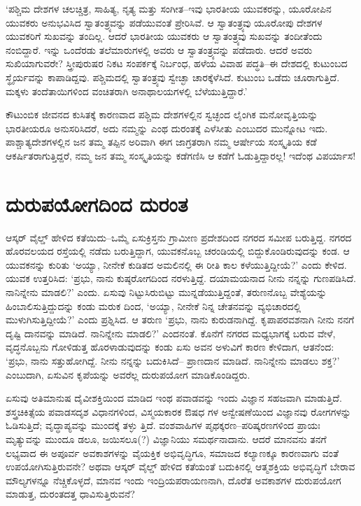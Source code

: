 ‘ಪಶ್ಚಿಮ ದೇಶಗಳ ಚಲಚ್ಚಿತ್ರ, ಸಾಹಿತ್ಯ, ನೃತ್ಯ ಮತ್ತು ಸಂಗೀತ–ಇವು ಭಾರತೀಯ ಯುವಕರನ್ನು, ಯೂರೋಪಿನ ಯುವಕರು ಅನುಭವಿಸಿದ ಸ್ವಾತಂತ್ರ್ಯವನ್ನು ಪಡೆಯುವಂತೆ ಪ್ರೇರಿಸಿವೆ. ಆ ಸ್ವಾತಂತ್ರ್ಯವು ಯೂರೋಪು ದೇಶಗಳ ಯುವಕರಿಗೆ ಸುಖವನ್ನು ತಂದಿಲ್ಲ. ಆದರೆ ಭಾರತೀಯ ಯುವಕರು ಆ ಸ್ವಾತಂತ್ರ್ಯವು ಸುಖವನ್ನು ತಂದೀತೆಂದು ನಂಬಿದ್ದಾರೆ. ಇನ್ನು ಒಂದೆರಡು ತಲೆಮಾರುಗಳಲ್ಲಿ ಅವರು ಆ ಸ್ವಾತಂತ್ರ್ಯವನ್ನು ಪಡೆದಾರು. ಆದರೆ ಅವರು ಸುಖಿಯಾಗುವರೇ? ಸ್ತ್ರೀಪುರುಷರ ನಿಕಟ ಸಂಪರ್ಕಕ್ಕೆ ನಿರ್ಬಂಧ, ಹಳೆಯ ವಿವಾಹ ಪದ್ಧತಿ–ಈ ದೇಶದಲ್ಲಿ ಕುಟುಂಬದ ಸ್ಥೈರ್ಯವನ್ನು ಕಾಪಾಡಿದ್ದವು. ಪಶ್ಚಿಮದಲ್ಲಿ ಸ್ವಾತಂತ್ರ್ಯವು ಸ್ವೇಚ್ಛಾ ಚಾರಕ್ಕೆಳೆಸಿದೆ. ಕುಟುಂಬ ಒಡೆದು ಚೂರಾಗುತ್ತಿದೆ. ಮಕ್ಕಳು ತಂದೆತಾಯಿಗಳಿಂದ ವಂಚಿತರಾಗಿ ಅನಾಥಾಲಯಗಳಲ್ಲಿ ಬೆಳೆಯುತ್ತಿದ್ದಾರೆ.’

ಕೌಟುಂಬಿಕ ಜೀವನದ ಕುಸಿತಕ್ಕೆ ಕಾರಣವಾದ ಪಶ್ಚಿಮ ದೇಶಗಳಲ್ಲಿನ ಸ್ವಚ್ಛಂದ ಲೈಂಗಿಕ ಮನೋವೃತ್ತಿಯನ್ನು ಭಾರತೀಯರೂ ಅನುಸರಿಸಿದರೆ, ಅದು ನಮ್ಮನ್ನು ಎಂಥ ದುರಂತಕ್ಕೆ ಎಳೆಸೀತು ಎಂಬುದರ ಮುನ್ನೋಟ ಇದು. ಪಾಶ್ಚಾತ್ಯದೇಶಗಳಲ್ಲಿನ ಜನ ತಮ್ಮ ತಪ್ಪಿನ ಅರಿವಾಗಿ ಈಗ ಜಾಗ್ರತರಾಗಿ ನಮ್ಮ ಆರ್ಷೇಯ ಸಂಸ್ಕೃತಿಯ ಕಡೆ ಆಕರ್ಷಿತರಾಗುತ್ತಿದ್ದರೆ, ನಮ್ಮ ಜನ ತಮ್ಮ ಸಂಸ್ಕೃತಿಯನ್ನು ಕಡೆಗಣಿಸಿ ಆ ಕಡೆಗೆ ಓಡುತ್ತಿದ್ದಾರಲ್ಲ! ಇದೆಂಥ ವಿಪರ್ಯಾಸ!


\section{ದುರುಪಯೋಗದಿಂದ ದುರಂತ}

ಆಸ್ಕರ್ ವೈಲ್ಡ್ ಹೇಳಿದ ಕತೆಯಿದು–ಒಮ್ಮೆ ಏಸುಕ್ರಿಸ್ತನು ಗ್ರಾಮೀಣ ಪ್ರದೇಶದಿಂದ ನಗರದ ಸಮೀಪ ಬರುತ್ತಿದ್ದ. ನಗರದ ಹೊರವಲಯದ ರಸ್ತೆಯಲ್ಲಿ ನಡೆದು ಬರುತ್ತಿದ್ದಾಗ, ಯುವಕನೊಬ್ಬ ಚರಂಡಿಯಲ್ಲಿ ಬಿದ್ದುಕೊಂಡಿರುವುದನ್ನು ಕಂಡ. ಆ ಯುವಕನನ್ನು ಕುರಿತು ‘ಅಯ್ಯಾ, ನೀನೇಕೆ ಕುಡಿತದ ಅಮಲಿನಲ್ಲಿ ಈ ರೀತಿ ಕಾಲ ಕಳೆಯುತ್ತಿದ್ದೀಯೆ?’ ಎಂದು ಕೇಳಿದ. ಯುವಕ ಉತ್ತರಿಸಿದ: ‘ಪ್ರಭು, ನಾನು ಕುಷ್ಠರೋಗದಿಂದ ನರಳುತ್ತಿದ್ದೆ. ದಯಾಮಯನಾದ ನೀನು ನನ್ನನ್ನು ಗುಣಪಡಿಸಿದೆ. ನಾನಿನ್ನೇನು ಮಾಡಲಿ?’ ಎಂದು. ಏಸುವು ನಿಟ್ಟುಸಿರುಬಿಟ್ಟು ಮುನ್ನಡೆಯುತ್ತಿದ್ದಂತೆ, ತರುಣನೊಬ್ಬ ವೇಶ್ಯೆಯನ್ನು ಹಿಂಬಾಲಿಸುತ್ತಿದ್ದುದನ್ನು ಕಂಡು ಮರುಕ ದಿಂದ, ‘ಅಯ್ಯಾ, ನೀನೇಕೆ ನಿನ್ನ ಚೇತನವನ್ನು ವ್ಯಭಿಚಾರದಲ್ಲಿ ಮುಳುಗಿಸುತ್ತಿದ್ದೀಯೆ?’ ಎಂದು ಪ್ರಶ್ನಿಸಿದ. ಆ ತರುಣ ‘ಪ್ರಭು, ನಾನು ಕುರುಡನಾಗಿದ್ದೆ. ಕೃಪಾಪರವಶನಾಗಿ ನೀನು ನನಗೆ ದೃಷ್ಟಿ ದಾನವನ್ನು ಮಾಡಿದೆ. ನಾನಿನ್ನೇನು ಮಾಡಲಿ?’ ಎಂದನಂತೆ. ಕೊನೆಗೆ ನಗರದ ಮಧ್ಯಭಾಗಕ್ಕೆ ಬರುವ ವೇಳೆ, ವೃದ್ಧನೊಬ್ಬನು ಗೋಳಿಡುತ್ತ ಹೊರಳಾಡುವುದನ್ನು ಕಂಡು ಏಸು ಅವನ ಅಳುವಿಗೆ ಕಾರಣ ಕೇಳಿದಾಗ, ಆತನೆಂದ: ‘ಪ್ರಭು, ನಾನು ಸತ್ತುಹೋಗಿದ್ದೆ. ನೀನು ನನ್ನನ್ನು ಬದುಕಿಸಿದೆ– ಪ್ರಾಣದಾನ ಮಾಡಿದೆ. ನಾನಿನ್ನೇನು ಮಾಡಲು ಶಕ್ತ?’ ಎಂಬುದಾಗಿ, ಏಸುವಿನ ಕೃಪೆಯನ್ನು ಅವರೆಲ್ಲ ದುರುಪಯೋಗ ಮಾಡಿಕೊಂಡಿದ್ದರು.

ಏಸುವು ಅತಿಮಾನುಷ ದೈವೀಶಕ್ತಿಯಿಂದ ಮಾಡಿದ ಇಂಥ ಪವಾಡವನ್ನು ಇಂದು ವಿಜ್ಞಾನ ಸಹಜವಾಗಿ ಮಾಡುತ್ತಿದೆ. ಶಸ್ತ್ರಚಿಕಿತ್ಸೆಯ ಪವಾಡಸದೃಶ ವಿಧಾನಗಳಿಂದ, ವಿಸ್ಮಯಕಾರಕ ಔಷಧ ಗಳ ಅನ್ವೇಷಣೆಯಿಂದ ವಿಜ್ಞಾನವು ರೋಗಗಳನ್ನು ಓಡಿಸುತ್ತಿದೆ; ವೃದ್ಧಾಪ್ಯವನ್ನು ಮುಂದಕ್ಕೆ ತಳ್ಳು ತ್ತಿದೆ. ವಂಶವಾಹಿಗಳ ಪೃಥಕ್ಕರಣ–ಪರಿಷ್ಕರಣಗಳಿಂದ ಪ್ರಾಯಃ ಮೃತ್ಯುವನ್ನು ಮುಂದೂ ಡಲೂ, ಜಯಿಸಲೂ(?) ವಿಜ್ಞಾನಿಯು ಸಮರ್ಥನಾದಾನು. ಆದರೆ ಮಾನವನು ತನಗೆ ಲಭ್ಯವಾದ ಈ ಅಪೂರ್ವ ಅವಕಾಶಗಳನ್ನು ವೈಯಕ್ತಿಕ ಅಭಿವೃದ್ಧಿಗೂ, ಸಮಾಜದ ಕಲ್ಯಾಣಕ್ಕೂ ಕಾರಣವಾಗು ವಂತೆ ಉಪಯೋಗಿಸುತ್ತಿರುವನೇ? ಅಥವಾ ಆಸ್ಕರ್ ವೈಲ್ಡ್ ಹೇಳಿದ ಕತೆಯಂತೆ ಬದುಕಿನಲ್ಲಿ ಆತ್ಮಶಕ್ತಿಯ ಅಭಿವೃದ್ಧಿಗೆ ಬೇರಾವ ಮೌಲ್ಯಗಳನ್ನೂ ನೆಚ್ಚಿಕೊಳ್ಳದೆ, ಮಾನವ ಇಂದು ಇಂದ್ರಿಯಪರಾಯಣನಾಗಿ, ದೊರೆತ ಅವಕಾಶಗಳ ದುರುಪಯೋಗ ಮಾಡುತ್ತ, ದುರಂತದತ್ತ ಧಾವಿಸುತ್ತಿರುವನೆ?

